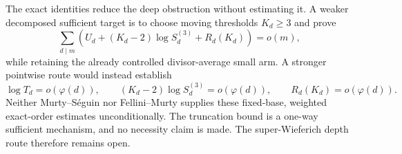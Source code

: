 The exact identities reduce the deep obstruction without estimating it.
A weaker decomposed sufficient target is to choose moving thresholds
$K_d\ge3$ and prove
\begin{equation}
 \sum_{d\mid m}\left(
   U_d+(K_d-2)\log S_d^{(3)}+R_d(K_d)
 \right)=o(m),
 \label{eq:open-gate}
\end{equation}
while retaining the already controlled divisor-average small arm.  A
stronger pointwise route would instead establish
\[
 \log T_d=o(\varphi(d)),\qquad
 (K_d-2)\log S_d^{(3)}=o(\varphi(d)),\qquad
 R_d(K_d)=o(\varphi(d)).
\]
Neither Murty--S\'eguin nor Fellini--Murty supplies these fixed-base,
weighted exact-order estimates unconditionally.  The truncation bound is a
one-way sufficient mechanism, and no necessity claim is made.  The
super-Wieferich depth route therefore remains open.
